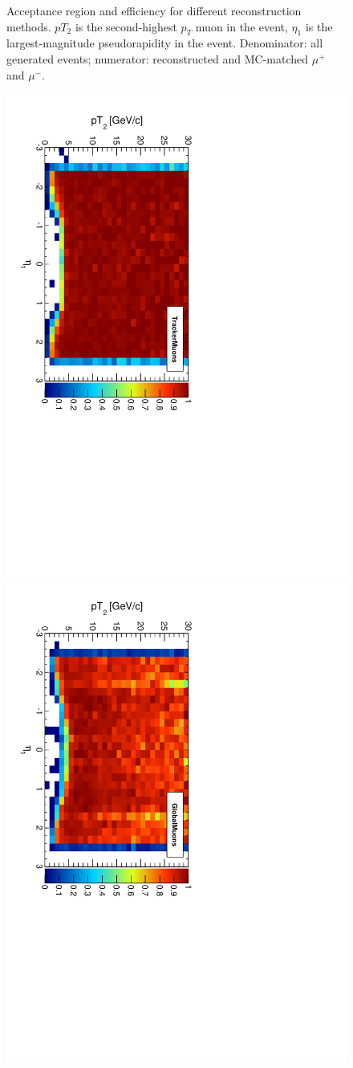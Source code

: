 \documentclass[12pt]{article}
\begin{document}
\begin{figure}[p]
\caption{Acceptance region and efficiency for different reconstruction
  methods.  $pT_2$ is the second-highest $p_T$ muon in the event,
  $\eta_1$ is the largest-magnitude pseudorapidity in the event.
  Denominator: all generated events; numerator: reconstructed
  and MC-matched $\mu^+$ and $\mu^-$. \label{fig:pt2vseta1}}
\end{figure}

\begin{figure}[p]
\includegraphics[height=0.5\linewidth, angle=90]{fig/acceptanceNoMCMatch_plot/pt2vseta1_TrackerMuons.pdf}
\includegraphics[height=0.5\linewidth, angle=90]{fig/acceptanceNoMCMatch_plot/pt2vseta1_GlobalMuons.pdf}


\end{figure}
\end{document}
